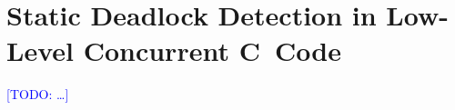 \documentclass[runningheads]{llncs}
\newcommand{\todo}[1]{\textcolor{blue}{[TODO: #1]}}
\begin{document}


\section{Static Deadlock Detection in Low-Level Concurrent C~Code}

\todo{\ldots}


\end{document}
